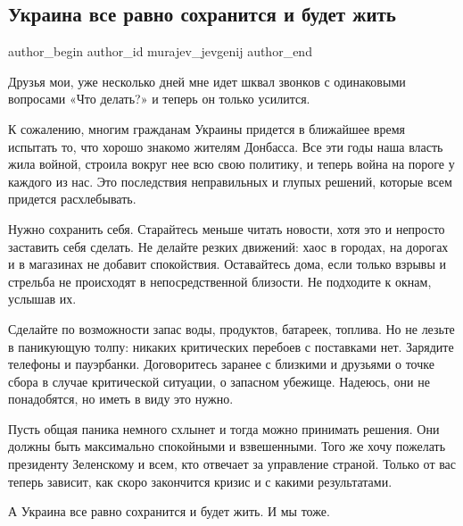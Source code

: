  
 
 
 
 
 
\subsection{Украина все равно сохранится и будет жить}
\label{sec:24_02_2022.fb.murajev_jevgenij.1.ukraina_vse_ravno_sohranitsa}
 
\ifcmt
 author_begin
   author_id murajev_jevgenij
 author_end
\fi

Друзья мои, уже несколько дней мне идет шквал звонков с одинаковыми вопросами
«Что делать?» и теперь он только усилится. 

К сожалению, многим гражданам Украины придется в ближайшее время испытать то,
что хорошо знакомо жителям Донбасса. Все эти годы наша власть жила войной,
строила вокруг нее всю свою политику, и теперь война на пороге у каждого из
нас. Это последствия неправильных и глупых решений, которые всем придется
расхлебывать. 

Нужно сохранить себя. Старайтесь меньше читать новости, хотя это и непросто
заставить себя сделать. Не делайте резких движений: хаос в городах, на дорогах
и в магазинах не добавит спокойствия. Оставайтесь дома, если только взрывы и
стрельба не происходят в непосредственной близости. Не подходите к окнам,
услышав их. 

Сделайте по возможности запас воды, продуктов, батареек, топлива. Но не лезьте
в паникующую толпу: никаких критических перебоев с поставками нет. Зарядите
телефоны и пауэрбанки. Договоритесь заранее с близкими и друзьями о точке сбора
в случае критической ситуации, о запасном убежище. Надеюсь, они не понадобятся,
но иметь в виду это нужно. 

Пусть общая паника немного схлынет и тогда можно принимать решения. Они должны
быть максимально спокойными и взвешенными. Того же хочу пожелать президенту
Зеленскому и всем, кто отвечает за управление страной. Только от вас теперь
зависит, как скоро закончится кризис и с какими результатами.

А Украина все равно сохранится и будет жить. И мы тоже.
